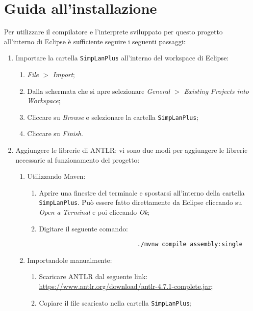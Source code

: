 \chapter{Guida all'installazione}\label{a:intstallazione}
Per utilizzare il compilatore e l'interprete sviluppato per questo progetto all'interno di Eclipse \`e sufficiente seguire i seguenti passaggi:
\begin{enumerate}
    \item Importare la cartella \verb|SimpLanPlus| all'interno del workspace di Eclipse:
        \begin{enumerate}
            \item \textit{File $>$ Import};
            \item Dalla schermata che si apre selezionare \textit{General $>$ Existing Projects into Workspace};
            \item Cliccare su \textit{Browse} e selezionare la cartella \verb|SimpLanPlus|;
            \item Cliccare su \textit{Finish}.
        \end{enumerate}
    \item Aggiungere le librerie di ANTLR: vi sono due modi per aggiungere le librerie necessarie al funzionamento del progetto:
        \begin{enumerate}
            \item Utilizzando Maven:
                \begin{enumerate}
                    \item Aprire una finestre del terminale e spostarsi all'interno della cartella \verb|SimpLanPlus|. Pu\`o essere fatto direttamente da Eclipse cliccando su \textit{Open a Terminal} e poi cliccando \textit{Ok};
                    \item Digitare il seguente comando:
                        \begin{lstlisting}
                            ./mvnw compile assembly:single
                        \end{lstlisting}
                \end{enumerate}
            \item Importandole manualmente:
                \begin{enumerate}
                    \item Scaricare ANTLR dal seguente link: \url{https://www.antlr.org/download/antlr-4.7.1-complete.jar};
                    \item Copiare il file scaricato nella cartella \verb|SimpLanPlus|;

\end{enumerate}
\end{enumerate}
\end{enumerate}
